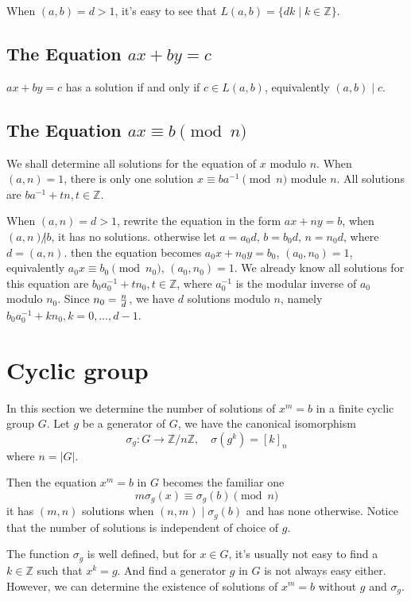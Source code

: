 \documentclass{article}
\def\abs#1{\left| {#1} \right|}
\def\zmod#1{\mathbb Z / {#1} \mathbb Z}
\begin{document}
When $(a, b) = d > 1$, it's easy to see that $L(a, b) = \{dk \mid k \in \mathbb Z\}$.

\subsection{The Equation $ax + by = c$}
$ax + by = c$ has a solution if and only if $c \in L(a, b)$, equivalently $(a, b) \mid c$.

\subsection{The Equation $ax \equiv b \pmod n$}
We shall determine all solutions for the equation of $x$ modulo $n$.
When $(a, n) = 1$, there is only one solution $x \equiv ba^{-1} \pmod n$ module $n$.
All solutions are $ba^{-1} + tn, t \in \mathbb Z$.


When $(a, n) = d > 1$, rewrite the equation in the form
$ax + ny = b$, when $(a, n) \not| b$, it has no solutions.
otherwise let $a = a_0 d$, $b = b_0d$, $n = n_0 d$, where $d = (a, n)$.
then the equation becomes $a_0 x + n_0 y = b_0$, $(a_0, n_0) = 1$,
equivalently $a_0 x \equiv b_0 \pmod n_0$, $(a_0, n_0) = 1$.
We already know all solutions for this equation are
$b_0 a_0^{-1} + t n_0, t \in \mathbb Z$, where $a_0^{-1}$ is the modular inverse of
$a_0$ modulo $n_0$. Since $n_0 = {n \over d}$, we have $d$ solutions modulo $n$,
namely $b_0 a_0^{-1} + k n_0, k = 0, \dots, d - 1$.


\section{Cyclic group}
In this section we determine the number of solutions of $x^m = b$ in a finite cyclic group $G$.
Let $g$ be a generator of $G$, we have the canonical isomorphism
$$\sigma_g: G \to \zmod n, \quad \sigma(g^k) = [k]_n$$ where $n = \abs G$.

Then the equation $x^m = b$ in $G$ becomes the familiar one
$$m \sigma_g(x) \equiv \sigma_g(b) \pmod n$$
it has $(m, n)$ solutions when $(n, m) \mid \sigma_g(b)$
and has none otherwise. Notice that the number of solutions is independent of choice of $g$.

The function $\sigma_g$ is well defined, but for $x \in G$, it's usually not easy to find a
$k \in \mathbb Z$ such that $x^k = g$. And find a generator $g$ in $G$ is not always easy either.
However, we can determine the existence of solutions of $x^m = b$ without $g$ and $\sigma_g$.
\end{document}
